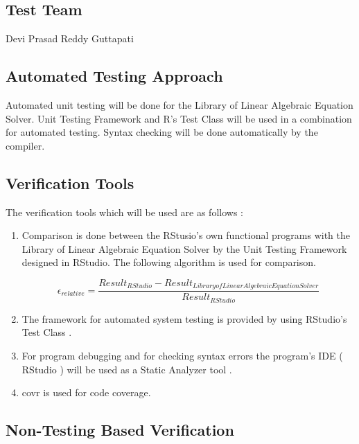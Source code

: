 \documentclass[12pt, titlepage]{article}
\begin{document}
\subsection{Test Team}

Devi Prasad Reddy Guttapati

\subsection{Automated Testing Approach}

Automated unit testing will be done for the Library of Linear Algebraic Equation
Solver. Unit Testing Framework and R's Test Class will be used in a combination
for automated testing. Syntax checking will be done automatically by the
compiler.

\subsection{Verification Tools}

The verification tools which will be used are as follows :

\begin{enumerate}

\item Comparison is done between the RStusio's own functional programs with the
Library of Linear Algebraic Equation Solver by the Unit Testing Framework
designed in RStudio. The following algorithm is used for comparison.


\[\epsilon_{relative} = \frac{Result_{RStudio} - Result_{Library of Linear Algebraic Equation Solver}}{Result_{RStudio}}\]



\item The framework for automated system testing is provided by using RStudio's Test Class .

\item For program debugging and for checking syntax errors the program's IDE ( RStudio ) will be used as a Static Analyzer tool .

\item covr is used for code coverage.
\end{enumerate}



\subsection{Non-Testing Based Verification}
		
\end{document}
